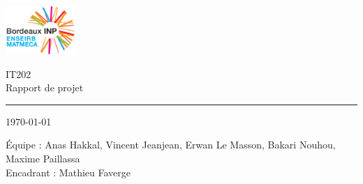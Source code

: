 \documentclass[a4paper,11pts]{article}
\begin{document}
\begin{center}

\includegraphics[width=100px]{img/enseirb-matmeca}

\Huge{IT202}\\
\Huge{Rapport de projet}
\noindent\rule{10cm}{0.4pt}

\normalsize{\today}

\vspace{1cm}

\Large{\'{E}quipe : Anas Hakkal, Vincent Jeanjean, Erwan Le Masson, Bakari Nouhou, Maxime Paillassa}\\
\Large{Encadrant : Mathieu Faverge}

\end{center}

\clearpage










\end{document}
